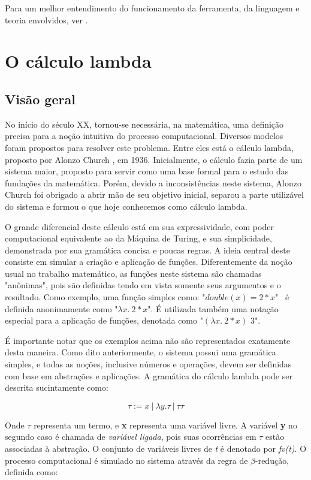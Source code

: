 Para um melhor entendimento do funcionamento da ferramenta, da linguagem e
teoria envolvidos, ver \cite{pierce}.


\section{O cálculo lambda}

\subsection{Visão geral}

No início do século XX, tornou-se necessária, na matemática, uma definição 
precisa para a noção intuitiva do processo computacional. Diversos modelos foram
propostos para resolver este problema. Entre eles está o cálculo lambda,
proposto por Alonzo Church \cite{lambda_first}, em 1936. Inicialmente, o cálculo
fazia parte de um sistema maior, proposto para servir como uma base
formal para o estudo das fundações da matemática. Porém, devido a
inconsistências neste sistema, Alonzo Church foi obrigado a abrir mão de seu
objetivo inicial, separou a parte utilizável do sistema e formou o que hoje
conhecemos como cálculo lambda.

O grande diferencial deste cálculo está em sua expressividade, com poder
computacional equivalente ao da Máquina de Turing, e sua simplicidade,
demonstrada por sua gramática concisa e poucas regras. A ideia central deste
consiste em simular a criação e aplicação de funções. Diferentemente da noção
usual no trabalho matemático, as funções neste sistema são chamadas "anônimas",
pois são definidas tendo em vista somente seus argumentos e o resultado. Como
exemplo, uma função simples como: "$double(x) = 2*x$" \ é definida anonimamente como
"$\lambda x.\ 2*x$". É utilizada também uma notação especial para a aplicação de
funções, denotada como "$ (\lambda x.\ 2*x)$  $3$".

É importante notar que os exemplos acima não são representados exatamente desta
maneira. Como dito anteriormente, o sistema possui uma gramática simples, e
todas as noções, inclusive números e operações, devem ser definidas com base em
abstrações e aplicações. A gramática do cálculo lambda pode ser descrita
sucintamente como:

\[ \tau := x\ |\ \lambda y.\tau\ |\ \tau \tau \]

Onde $\tau$ representa um termo, e \textbf{x} representa uma variável livre. A
variável \textbf{y} no segundo caso é chamada de \textit{variável ligada},
pois suas ocorrências em $\tau$ estão associadas à abstração. 
O conjunto de variáveis livres de \emph{t} é denotado por \emph{fv(t)}. O processo
computacional é simulado no sistema através da regra de $\beta$-redução,
definida como:


